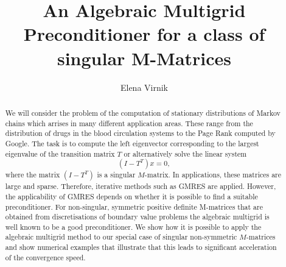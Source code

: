 \documentclass[a4paper,12pt]{article}
\title{An Algebraic Multigrid Preconditioner for a class of singular M-Matrices}
\author{Elena Virnik}
\begin{document}
\maketitle

\begin{abstract}
We will consider the problem of the computation of stationary distributions of Markov chains which arrises in many different application areas. These range from the distribution of drugs in the blood circulation systems to the Page Rank computed by Google. The task is to compute the left eigenvector corresponding to the largest eigenvalue of the transition matrix $T$ or alternatively solve the linear system
$$(I-T^T)x=0,$$
where the matrix $(I-T^T)$ is a singular $M$-matrix. In applications, these matrices are large and sparse. Therefore, iterative methods such as GMRES are applied. However, the applicability of GMRES depends on whether it is possible to find a suitable preconditioner. For non-singular, symmetric positive definite M-matrices that are obtained from discretisations of boundary value problems the algebraic multigrid is well known to be a good preconditioner. We show how it is possible to apply the algebraic multigrid method to our special case of singular non-symmetric $M$-matrices and show numerical examples that illustrate that this leads to significant acceleration of the convergence speed.
\end{abstract}
\end{document}
